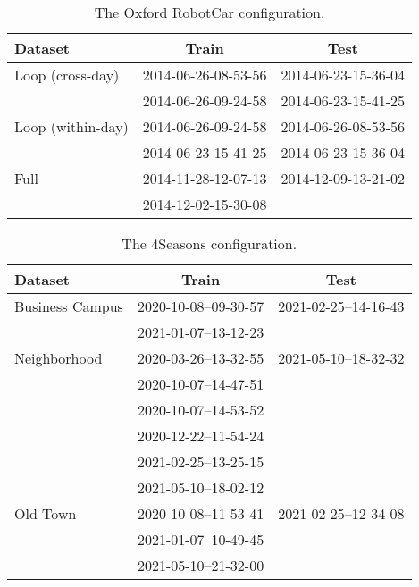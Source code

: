 \documentclass[letterpaper]{article} \usepackage{aaai23}  \usepackage{times}  \usepackage{helvet}  \usepackage{courier}  \usepackage[hyphens]{url}  \usepackage{graphicx} \urlstyle{rm} \def\UrlFont{\rm}  \usepackage{natbib}  \usepackage{caption} \frenchspacing  \setlength{\pdfpagewidth}{8.5in} \setlength{\pdfpageheight}{11in} \usepackage{booktabs}
\theoremstyle{remark}
\theoremstyle{plain}
\begin{document}
\begin{table}[!htb]\footnotesize
\centering
\begin{tabular}{l | c  |  c   } 
\toprule
Dataset & Train & Test \\
\midrule
Loop (cross-day) 
&  2014-06-26-08-53-56  &  2014-06-23-15-36-04 \\
&  2014-06-26-09-24-58  &  2014-06-23-15-41-25 \\
\midrule
Loop (within-day) 
&  2014-06-26-09-24-58  &  2014-06-26-08-53-56 \\
&  2014-06-23-15-41-25  &  2014-06-23-15-36-04 \\
\midrule
Full 
&  2014-11-28-12-07-13  &  2014-12-09-13-21-02 \\
&  2014-12-02-15-30-08  &   \\

\bottomrule
\end{tabular}
\caption{The Oxford RobotCar configuration.}
\label{stab:oxford config}
\end{table}




\begin{table}[!htb]\footnotesize
\centering
\begin{tabular}{l | c  |  c   } 
\toprule
Dataset & Train & Test \\
\midrule
Business Campus
&  2020-10-08--09-30-57  &  2021-02-25--14-16-43\\
&  2021-01-07--13-12-23  &  \\
\midrule
Neighborhood
& 2020-03-26--13-32-55		 & 2021-05-10--18-32-32		  \\
& 2020-10-07--14-47-51		 &  \\
& 2020-10-07--14-53-52		 &  \\
& 2020-12-22--11-54-24		 &  \\
& 2021-02-25--13-25-15		 &  \\
& 2021-05-10--18-02-12		 &  \\
\midrule
Old Town
& 2020-10-08--11-53-41	 &  2021-02-25--12-34-08	 \\
& 2021-01-07--10-49-45	 &   \\
& 2021-05-10--21-32-00	 &   \\
\bottomrule
\end{tabular}
\caption{The 4Seasons configuration.}
\label{stab:4seasons config}
\end{table}
\end{document}
